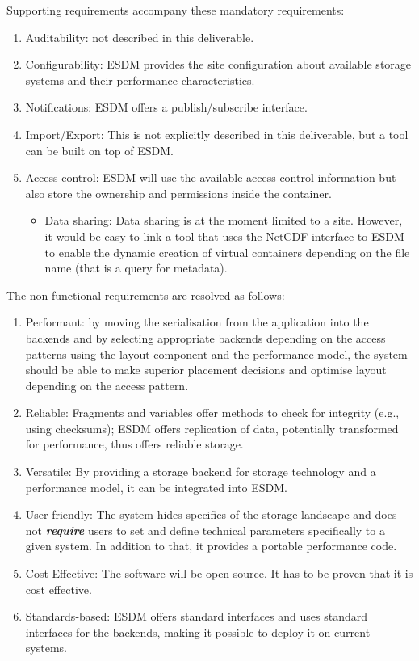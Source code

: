 Supporting requirements accompany these mandatory requirements:
\begin{enumerate}
\item Auditability: not described in this deliverable.
\item Configurability: ESDM provides the site configuration about available storage systems and their performance characteristics.
\item Notifications: ESDM offers a publish/subscribe interface.
\item Import/Export: This is not explicitly described in this deliverable, but a tool can be built on top of ESDM.
\item Access control: ESDM will use the available access control information but also store the ownership and permissions inside the container.
\begin{itemize}
\item Data sharing: Data sharing is at the moment limited to a site.
However, it would be easy to link a tool that uses the NetCDF interface to ESDM to enable the dynamic creation of virtual containers depending on the file name (that is a query for metadata).
\end{itemize}
\end{enumerate}

The non-functional requirements are resolved as follows:
\begin{enumerate}
\item Performant: by moving the serialisation from the application into the backends and by selecting appropriate backends depending on the access patterns using the layout component and the performance model, the system should be able to make superior placement decisions and optimise layout depending on the access pattern.
\item Reliable: Fragments and variables offer methods to check for integrity (e.g., using checksums); ESDM offers replication of data, potentially transformed for performance, thus offers reliable storage.

\item Versatile: By providing a storage backend for storage technology and a performance model, it can be integrated into ESDM.
\item User-friendly: The system hides specifics of the storage landscape and does not \textit{\textbf{require}} users to set and define technical parameters specifically to a given system.
In addition to that, it provides a portable performance code.
\item Cost-Effective: The software will be open source. It has to be proven that it is cost effective.
\item Standards-based: ESDM offers standard interfaces and uses standard interfaces for the backends, making it possible to deploy it on current systems.
\end{enumerate}

